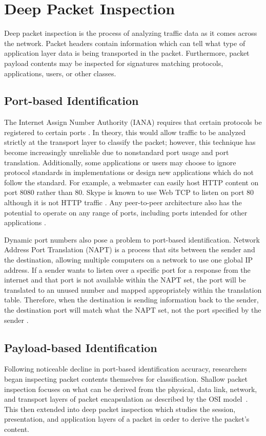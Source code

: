 \section{Deep Packet Inspection}
Deep packet inspection is the process of analyzing traffic data as it comes across the network. Packet headers contain information which can tell what type of application layer data is being transported in the packet. Furthermore, packet payload contents may be inspected for signatures matching protocols, applications, users, or other classes.

\subsection{Port-based Identification}
The Internet Assign Number Authority (IANA) requires that certain protocols be registered to certain ports \cite{IANA}. In theory, this would allow traffic to be analyzed strictly at the transport layer to classify the packet; however, this technique has become increasingly unreliable due to nonstandard port usage and port translation. Additionally, some applications or users may choose to ignore protocol standards in implementations or design new applications which do not follow the standard. For example, a webmaster can easily host HTTP content on port 8080 rather than 80. Skype is known to use Web TCP to listen on port 80 although it is not HTTP traffic \cite{Freire}. Any peer-to-peer architecture also has the potential to operate on any range of ports, including ports intended for other applications \cite{Karagiannis}.

Dynamic port numbers also pose a problem to port-based identification. Network Address Port Translation (NAPT) is a process that sits between the sender and the destination, allowing multiple computers on a network to use one global IP address. If a sender wants to listen over a specific port for a response from the internet and that port is not available within the NAPT set, the port will be translated to an unused number and mapped appropriately within the translation table. Therefore, when the destination is sending information back to the sender, the destination port will match what the NAPT set, not the port specified by the sender \cite{Smith}.

\subsection{Payload-based Identification}
Following noticeable decline in port-based identification accuracy, researchers began inspecting packet contents themselves for classification. Shallow packet inspection focuses on what can be derived from the physical, data link, network, and transport layers of packet encapsulation as described by the OSI model~\cite{OSI}. This then extended into deep packet inspection which studies the session, presentation, and application layers of a packet in order to derive the packet's content.

